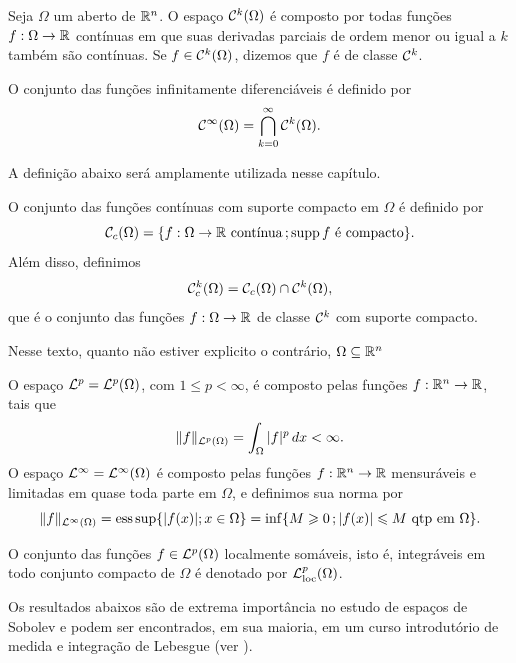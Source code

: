 \begin{dbox}
    Seja $\Omega$ um aberto de $\mathbb{R}^n$. O espaço $\mathcal{C}^k(\Omega)$ é composto por todas funções $f : \Omega \to \mathbb{R}$ contínuas em que suas derivadas parciais de ordem menor ou igual a $k$ também são contínuas.
    Se $f \in \mathcal{C}^k(\Omega)$, dizemos que $f$ é de classe $\mathcal{C}^k$.

    O conjunto das funções infinitamente diferenciáveis é definido por
    \[
        \mathcal{C}^\infty(\Omega) = \bigcap_{k=0}^\infty \mathcal{C}^k(\Omega).
    \]
\end{dbox}

A definição abaixo será amplamente utilizada nesse capítulo.

\begin{dbox}
    O conjunto das funções contínuas com suporte compacto em $\Omega$ é definido por
    \[
        \mathcal{C}_c(\Omega) = \{f : \Omega \to \mathbb{R} \text{ contínua} \,; \mathrm{supp}\, f \text{ é compacto}\}.
    \]
    Além disso, definimos
    \[
        \mathcal{C}^k_c(\Omega) = \mathcal{C}_c(\Omega) \cap \mathcal{C}^k(\Omega),
    \]
    que é o conjunto das funções $f : \Omega \to \mathbb{R}$ de classe $\mathcal{C}^k$ com suporte compacto.
\end{dbox}

Nesse texto, quanto não estiver explicito o contrário, $\Omega \subseteq \mathbb{R}^n$

\begin{dbox}
    O espaço $\mathcal{L}^p = \mathcal{L}^p(\Omega)$, com $1 \leqslant p < \infty$, é composto pelas funções $f : \mathbb{R}^n \to \mathbb{R}$, tais que
    \[
        \Vert f \Vert_{\mathcal{L}^p(\Omega)} = \int_\Omega |f|^p \, dx < \infty.
    \]
    O espaço $\mathcal{L}^\infty = \mathcal{L}^\infty(\Omega)$ é composto pelas funções $f : \mathbb{R}^n \to \mathbb{R}$ mensuráveis e limitadas em quase toda parte em $\Omega$, e definimos sua norma por
    \[
        \Vert f \Vert_{\mathcal{L}^\infty(\Omega)} = \mathrm{ess\,sup} \{|f(x)|; x \in \Omega\} =\inf \{M \geqslant 0 \,; |f(x)| \leqslant M \text{ qtp em } \Omega\}.
    \]
\end{dbox}

\begin{dbox}
    O conjunto das funções $f \in \mathcal{L}^p(\Omega)$ localmente somáveis, isto é, integráveis em todo conjunto compacto de $\Omega$ é denotado por $\mathcal{L}^p_{\mathrm{loc}}(\Omega)$.
\end{dbox}

Os resultados abaixos são de extrema importância no estudo de espaços de Sobolev e podem ser encontrados, em sua maioria, em um curso introdutório de medida e integração de Lebesgue (ver \cite{axler-measure.theory,bartle-measure.theory,folland-real.analysis}).

